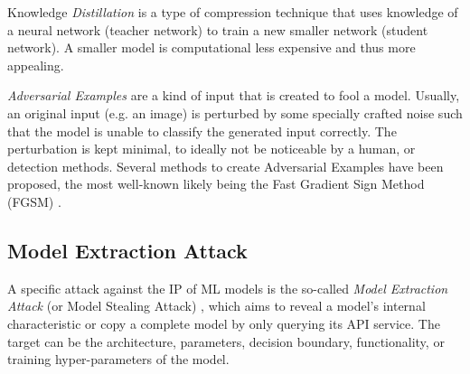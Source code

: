 Knowledge \textit{Distillation} \cite{hinton_distilling_2015} is a type of compression technique that uses knowledge of a neural network (teacher network) to train a new smaller network (student network). A smaller model is computational less expensive and thus more appealing.


\textit{Adversarial Examples} \cite{szegedy_intriguing_2014} are a kind of input that is created to fool a model. Usually, an original input (e.g. an image) is perturbed by some specially crafted noise such that the model is unable to classify the generated input correctly. The perturbation is kept minimal, to ideally not be noticeable by a human, or detection methods. Several methods to create Adversarial Examples have been proposed, the most well-known likely being the Fast Gradient Sign Method (FGSM) \cite{goodfellow_explaining_2015}.

\subsection{Model Extraction Attack}

A specific attack against the IP of ML models is the so-called \textit{Model Extraction Attack} (or Model Stealing Attack) \cite{tramer_stealing_2016}, which aims to reveal a model's internal characteristic or copy a complete model by only querying its API service. The target can be the architecture, parameters, decision boundary, functionality, or training hyper-parameters of the model.


